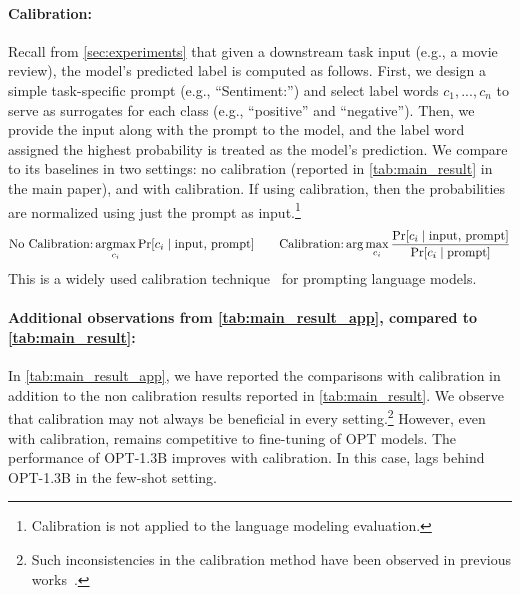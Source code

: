 \paragraph{Calibration:} Recall from \cref{sec:experiments} that given a downstream task input (e.g., a movie review), the model's predicted label is computed as follows. First, we design a simple task-specific prompt (e.g., ``Sentiment:'') and select label words $c_1,...,c_n$ to serve as surrogates for each class (e.g., ``positive'' and ``negative''). Then, we provide the input along with the prompt to the model, and the label word assigned the highest probability is treated as the model's prediction. We compare \simulator{} to its baselines in two settings: no calibration (reported in \cref{tab:main_result} in the main paper), and with calibration. If using calibration, then the probabilities are normalized using just the prompt as input.\footnote{Calibration is not applied to the language modeling evaluation.}  
$$
\text{No Calibration:} \mathop{\mathrm{argmax}}_{c_i} \Pr[c_i\mid\text{input, prompt}] \qquad
\text{Calibration:} \arg\max_{c_i} \frac{\Pr[c_i\mid\text{input, prompt}]}{\Pr[c_i\mid \text{prompt}]}
$$
This is a widely used calibration technique~\citep{holtzman2021surface} for prompting language models.

\paragraph{Additional observations from \cref{tab:main_result_app}, compared to \cref{tab:main_result}:} In \cref{tab:main_result_app}, we have reported the comparisons with calibration in addition to the non calibration results reported in \cref{tab:main_result}. We observe that calibration may not always be beneficial in every setting.\footnote{Such inconsistencies in the calibration method have been observed in previous works~\citep{brown2020language}.} However, even with calibration, \simulator{} remains competitive to fine-tuning of OPT models. The performance of OPT-1.3B improves with calibration. In this case, \simulator{} lags behind OPT-1.3B in the few-shot setting.

